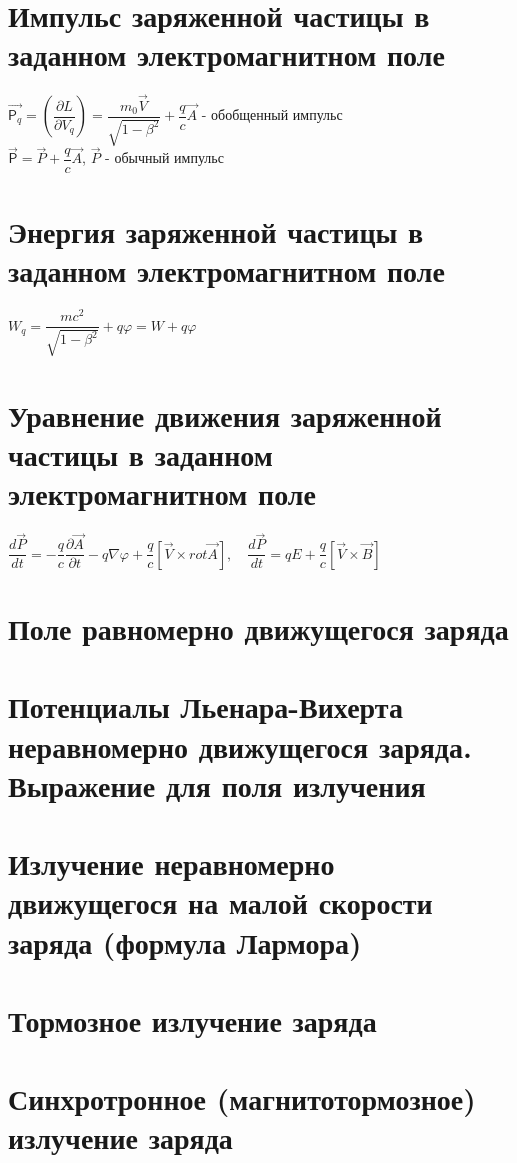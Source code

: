 \begin{multicols*}{2}
		\section{Импульс заряженной частицы в заданном электромагнитном поле}
		$\vec{\mathsf{P}_q} = (\dfrac{\partial L}{\partial V_q}) = \dfrac{m_0\vec{V}}{\sqrt{1-\beta^2}} + \dfrac{q}{c}\vec{A}$ - обобщенный импульс\\
		$\vec{\mathsf{P}} = \vec{P} + \dfrac{q}{c}\vec{A}$, \quad $\vec{P}$ - обычный импульс
		
		\section{Энергия заряженной частицы в заданном электромагнитном поле}
		$W_q = \dfrac{mc^2}{\sqrt{1-\beta^2}} + q\varphi = W + q\varphi$
		
		\section{Уравнение движения заряженной частицы в заданном электромагнитном поле}
		$\dfrac{d\vec{P}}{dt} = -\dfrac{q}{c}\dfrac{\partial \vec{A}}{\partial t} - q\nabla \varphi + \dfrac{q}{c}\left[\vec{V}\times rot\vec{A}\right], \quad \dfrac{d\vec{P}}{dt} = qE + \dfrac{q}{c}\left[\vec{V}\times \vec{B}\right] $
		
		\section{Поле равномерно движущегося заряда}
		
		\section{Потенциалы Льенара-Вихерта неравномерно движущегося заряда. Выражение для поля излучения}
		
		\section{Излучение неравномерно движущегося на малой скорости заряда (формула Лармора)}
		
		\section{Тормозное излучение заряда}
		
		\section{Синхротронное (магнитотормозное) излучение заряда}
		

\end{multicols*}
